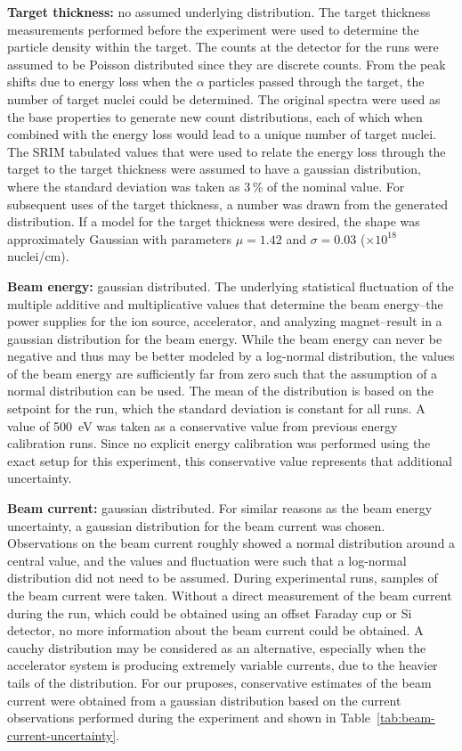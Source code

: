 \textbf{Target thickness:} no assumed underlying distribution. The
target thickness measurements performed before the experiment were used
to determine the particle density within the target. The counts at the
detector for the runs were assumed to be Poisson distributed since they
are discrete counts. From the peak shifts due to energy loss when the
$\alpha$ particles passed through the target, the number of target
nuclei could be determined. The original spectra were used as the base
properties to generate new count distributions, each of which when
combined with the energy loss would lead to a unique number of target
nuclei. The SRIM tabulated values that were used to relate the energy
loss through the target to the target thickness were assumed to have a
gaussian distribution, where the standard deviation was taken as 3\,\%
of the nominal value. For subsequent uses of the target thickness, a
number was drawn from the generated distribution. If a model for the
target thickness were desired, the shape was approximately Gaussian with
parameters $\mu = 1.42$ and $\sigma = 0.03$ ($\times 10^{18}$
nuclei/cm\squared{}).

\textbf{Beam energy:} gaussian distributed. The underlying statistical
fluctuation of the multiple additive and multiplicative values that
determine the beam energy\---{}the power supplies for the ion source,
accelerator, and analyzing magnet\---{}result in a gaussian distribution
for the beam energy. While the beam energy can never be negative and
thus may be better modeled by a log-normal distribution, the values of
the beam energy are sufficiently far from zero such that the assumption
of a normal distribution can be used. The mean of the distribution is
based on the setpoint for the run, which the standard deviation is
constant for all runs. A value of 500~eV was taken as a conservative
value from previous energy calibration runs. Since no explicit energy
calibration was performed using the exact setup for this experiment,
this conservative value represents that additional uncertainty.

\textbf{Beam current:} gaussian distributed. For similar reasons as the
beam energy uncertainty, a gaussian distribution for the beam current
was chosen. Observations on the beam current roughly showed a normal
distribution around a central value, and the values and fluctuation were
such that a log-normal distribution did not need to be assumed. During
experimental runs, samples of the beam current were taken. Without a
direct measurement of the beam current during the run, which could be
obtained using an offset Faraday cup or Si detector, no more information
about the beam current could be obtained. A cauchy distribution may be
considered as an alternative, especially when the accelerator system is
producing extremely variable currents, due to the heavier tails of the
distribution. For our pruposes, conservative estimates of the beam
current were obtained from a gaussian distribution based on the current
observations performed during the experiment and shown in
Table~\ref{tab:beam-current-uncertainty}.

